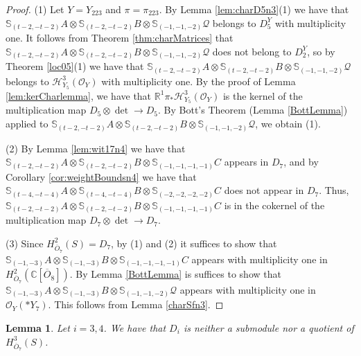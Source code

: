 \documentclass[11pt,reqno]{amsart}
\newcommand{\oo}{\otimes}
\newcommand{\bS}{\mathbb{S}}
\newcommand{\C}{\mathbb{C}}
\renewcommand{\det}{\operatorname{det}}
\newcommand{\mc}[1]{\mathcal{#1}}
\newcommand{\ol}[1]{\overline{#1}}
\newtheorem{lemma}[theorem]{Lemma}
\numberwithin{equation}{section}
\begin{document}
\begin{proof}


(1)  Let $Y=Y_{223}$ and $\pi=\pi_{223}$. By Lemma \ref{lem:charD5n3}(1) we have that $\bS_{(t-2,-t-2)}A \oo \bS_{(t-2,-t-2)}B\oo \bS_{(-1,-1,-2)}\mc{Q}$ belongs to $D_5^{Y}$ with multiplicity one. It follows from Theorem \ref{thm:charMatrices} that $\bS_{(t-2,-t-2)}A \oo \bS_{(t-2,-t-2)}B\oo \bS_{(-1,-1,-2)}\mc{Q}$ does not belong to $D_2^Y$, so by Theorem \ref{loc05}(1) we have that $\bS_{(t-2,-t-2)}A \oo \bS_{(t-2,-t-2)}B\oo \bS_{(-1,-1,-2)}\mc{Q}$ belongs to $\mathscr{H}^3_{Y_5}(\mc{O}_Y)$ with multiplicity one. By the proof of Lemma \ref{lem:kerCharlemma}, we have that $\mathbb{R}^1\pi_{\ast}\mathscr{H}^3_{Y_5}(\mc{O}_Y)$ is the kernel of the multiplication map $D_5\oo \det \to D_5$. By Bott's Theorem (Lemma \ref{BottLemma}) applied to $\bS_{(t-2,-t-2)}A \oo \bS_{(t-2,-t-2)}B\oo \bS_{(-1,-1,-2)}\mc{Q}$, we obtain (1). 

(2) By Lemma \ref{lem:wit17n4} we have that $\bS_{(t-2,-t-2)}A \oo \bS_{(t-2,-t-2)}B\oo \bS_{(-1,-1,-1,-1)}C$ appears in $D_7$, and by Corollary \ref{cor:weightBoundsn4} we have that $\bS_{(t-4,-t-4)}A \oo \bS_{(t-4,-t-4)}B\oo \bS_{(-2,-2,-2,-2)}C$ does not appear in $D_7$. Thus, $\bS_{(t-2,-t-2)}A \oo \bS_{(t-2,-t-2)}B\oo \bS_{(-1,-1,-1,-1)}C$ is in the cokernel of the multiplication map $D_7\oo \det \to D_7$.

(3) Since $H^2_{\ol{O}_7}(S)=D_7$, by (1) and (2) it suffices to show that $\bS_{(-1,-3)}A \oo \bS_{(-1,-3)}B\oo \bS_{(-1,-1,-1,-1)}C$ appears with multiplicity one in $H^2_{\ol{O}_7}(\C[\ol{O}_8])$. By Lemma \ref{BottLemma} is suffices to show that $\bS_{(-1,-3)}A \oo \bS_{(-1,-3)}B\oo \bS_{(-1,-1,-2)}\mc{Q}$ appears with multiplicity one in $\mc{O}_Y(\ast Y_7)$. This follows from Lemma \ref{charSfn3}.
\end{proof}






\begin{lemma}\label{lem:no34in7} Let $i=3,4$. We have that $D_i$ is neither a submodule nor a quotient of $	H^3_{\ol{O}_7}(S)$.
\end{lemma}
\end{document}
